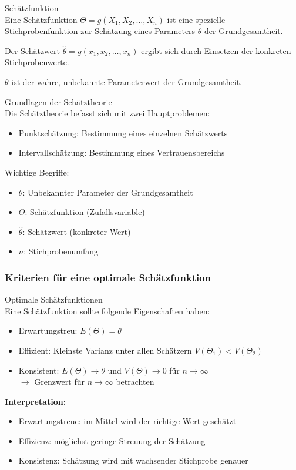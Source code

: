 \begin{definition}{Schätzfunktion}\\
Eine Schätzfunktion $\Theta = g(X_1,X_2,\ldots,X_n)$ ist eine spezielle Stichprobenfunktion zur Schätzung eines Parameters $\theta$ der Grundgesamtheit.

Der Schätzwert $\hat{\theta} = g(x_1,x_2,\ldots,x_n)$ ergibt sich durch Einsetzen der konkreten Stichprobenwerte.

$\theta$ ist der wahre, unbekannte Parameterwert der Grundgesamtheit.
\end{definition}

\begin{concept}{Grundlagen der Schätztheorie}\\
Die Schätztheorie befasst sich mit zwei Hauptproblemen:
\begin{itemize}
  \item Punktschätzung: Bestimmung eines einzelnen Schätzwerts
  \item Intervallschätzung: Bestimmung eines Vertrauensbereichs
\end{itemize}

Wichtige Begriffe:
\begin{itemize}
  \item $\theta$: Unbekannter Parameter der Grundgesamtheit
  \item $\Theta$: Schätzfunktion (Zufallsvariable)
  \item $\hat{\theta}$: Schätzwert (konkreter Wert)
  \item $n$: Stichprobenumfang
\end{itemize}
\end{concept}

\subsubsection{Kriterien für eine optimale Schätzfunktion}

\begin{concept}{Optimale Schätzfunktionen}\\
Eine Schätzfunktion sollte folgende Eigenschaften haben:

\begin{itemize}
    \item Erwartungstreu: $E(\Theta) = \theta$
    \item Effizient: Kleinste Varianz unter allen Schätzern $V(\Theta_1)<V(\Theta_2)$
    \item Konsistent: $E(\Theta) \to \theta$ und $V(\Theta) \to 0$ für $n \to \infty$\\
    $\rightarrow$ Grenzwert für $n \to \infty$ betrachten
\end{itemize}

\textbf{Interpretation:}
\begin{itemize}
  \item Erwartungstreue: im Mittel wird der richtige Wert geschätzt
  \item Effizienz: möglichst geringe Streuung der Schätzung
  \item Konsistenz: Schätzung wird mit wachsender Stichprobe genauer
\end{itemize}
\end{concept}

